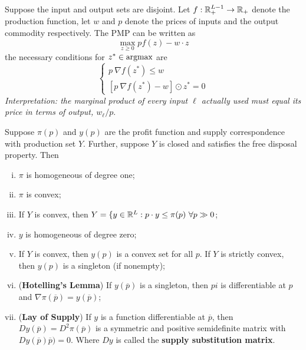 \documentclass{article}
\begin{document}
	 		\begin{definition}
	 			Suppose the input and output sets are disjoint. Let $f: \mathbb{R}^{L-1}_+ \to \mathbb{R}_+$ denote the production function, let $w$ and $p$ denote the prices of inputs and the output commodity respectively. The PMP can be written as 
	 			\begin{equation}
	 				\max_{z \geq 0} p f(z) - w \cdot z
	 			\end{equation}
	 			the necessary conditions for $z^* \in \operatorname*{argmax}$ are
	 			\begin{equation}
		 			\begin{cases}
		 				p\ \nabla f(z^*) \leq w \\
		 				\left[p\ \nabla f(z^*) - w\right] \odot z^* = 0
		 			\end{cases}
	 			\end{equation}
	 			\emph{Interpretation: the marginal product of every input $\ell$ actually used must equal its price in terms of output, $w_\ell / p$}.
	 		\end{definition}
	 		
	 		\begin{proposition}[5.C.1]
	 			Suppose $\pi(p)$ and $y(p)$ are the profit function and supply correspondence with production set $Y$. Further, suppose $Y$ is closed and satisfies the free disposal property. Then
	 			\begin{enumerate}[(i)]
	 				\item $\pi$ is homogeneous of degree one;
	 				\item $\pi$ is convex;
	 				\item If $Y$ is convex, then $Y = \{y \in \mathbb{R}^L: p \cdot y \leq \pi (p)\ \forall p \gg 0$;
	 				\item $y$ is homogeneous of degree zero;
	 				\item If $Y$ is convex, then $y(p)$ is a convex set for all $p$. If $Y$ is strictly convex, then $y(p)$ is a singleton (if nonempty);
	 				\item (\textbf{Hotelling's Lemma}) If $y(\overline{p})$ is a singleton, then $pi$ is differentiable at $p$ and $\nabla \pi (\overline{p}) = y(\overline{p})$;
	 				\item (\textbf{Lay of Supply}) If $y$ is a function differentiable at $\overline{p}$, then $Dy(\overline{p})=D^2 \pi(\overline{p})$ is a symmetric and positive semidefinite matrix with $Dy(\overline{p}) \overline{p})=0$. Where $Dy$ is called the \textbf{supply substitution matrix}.
	 			\end{enumerate}
	 		\end{proposition}
	 		
\end{document}
